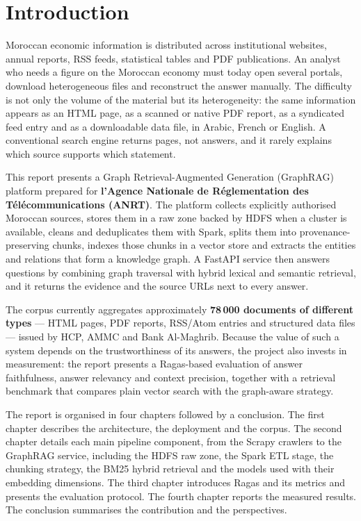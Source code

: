 \chapter*{Introduction}

Moroccan economic information is distributed across institutional websites, annual reports, RSS feeds, statistical tables and PDF publications. An analyst who needs a figure on the Moroccan economy must today open several portals, download heterogeneous files and reconstruct the answer manually. The difficulty is not only the volume of the material but its heterogeneity: the same information appears as an HTML page, as a scanned or native PDF report, as a syndicated feed entry and as a downloadable data file, in Arabic, French or English. A conventional search engine returns pages, not answers, and it rarely explains which source supports which statement.

This report presents a Graph Retrieval-Augmented Generation (GraphRAG) platform prepared for \textbf{l'Agence Nationale de Réglementation des Télécommunications (ANRT)}. The platform collects explicitly authorised Moroccan sources, stores them in a raw zone backed by HDFS when a cluster is available, cleans and deduplicates them with Spark, splits them into provenance-preserving chunks, indexes those chunks in a vector store and extracts the entities and relations that form a knowledge graph. A FastAPI service then answers questions by combining graph traversal with hybrid lexical and semantic retrieval, and it returns the evidence and the source URLs next to every answer.

The corpus currently aggregates approximately \textbf{78\,000 documents of different types} --- HTML pages, PDF reports, RSS/Atom entries and structured data files --- issued by HCP, AMMC and Bank Al-Maghrib. Because the value of such a system depends on the trustworthiness of its answers, the project also invests in measurement: the report presents a Ragas-based evaluation of answer faithfulness, answer relevancy and context precision, together with a retrieval benchmark that compares plain vector search with the graph-aware strategy.

The report is organised in four chapters followed by a conclusion. The first chapter describes the architecture, the deployment and the corpus. The second chapter details each main pipeline component, from the Scrapy crawlers to the GraphRAG service, including the HDFS raw zone, the Spark ETL stage, the chunking strategy, the BM25 hybrid retrieval and the models used with their embedding dimensions. The third chapter introduces Ragas and its metrics and presents the evaluation protocol. The fourth chapter reports the measured results. The conclusion summarises the contribution and the perspectives.
